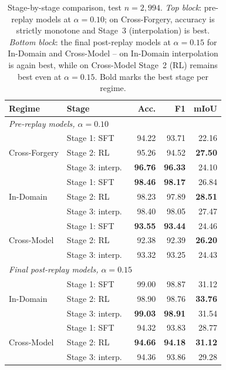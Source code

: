 \documentclass[10pt,twocolumn,letterpaper]{article}
\begin{document}
\begin{table}[h]
\centering
\small
\caption{Stage-by-stage comparison, test $n{=}2{,}994$. \emph{Top block}: pre-replay models at $\alpha{=}0.10$; on Cross-Forgery, accuracy is strictly monotone and Stage~3 (interpolation) is best. \emph{Bottom block}: the final post-replay models at $\alpha{=}0.15$ for In-Domain and Cross-Model -- on In-Domain interpolation is again best, while on Cross-Model Stage~2 (RL) remains best even at $\alpha{=}0.15$. Bold marks the best stage per regime.}
\label{tab:ablation-regime-transfer}
\begin{tabular}{llrrr}
\toprule
Regime & Stage & Acc. & F1 & mIoU \\
\midrule
\multicolumn{5}{l}{\textit{Pre-replay models, $\alpha{=}0.10$}} \\
\midrule
\multirow{3}{*}{Cross-Forgery} & Stage 1: SFT & 94.22 & 93.71 & 22.16 \\
 & Stage 2: RL & 95.26 & 94.52 & \textbf{27.50} \\
 & Stage 3: interp.\ & \textbf{96.76} & \textbf{96.33} & 24.10 \\
\midrule
\multirow{3}{*}{In-Domain} & Stage 1: SFT & \textbf{98.46} & \textbf{98.17} & 26.84 \\
 & Stage 2: RL & 98.23 & 97.89 & \textbf{28.51} \\
 & Stage 3: interp.\ & 98.40 & 98.05 & 27.47 \\
\midrule
\multirow{3}{*}{Cross-Model} & Stage 1: SFT & \textbf{93.55} & \textbf{93.44} & 24.46 \\
 & Stage 2: RL & 92.38 & 92.39 & \textbf{26.20} \\
 & Stage 3: interp.\ & 93.32 & 93.25 & 24.43 \\
\midrule
\multicolumn{5}{l}{\textit{Final post-replay models, $\alpha{=}0.15$}} \\
\midrule
\multirow{3}{*}{In-Domain} & Stage 1: SFT & 99.00 & 98.87 & 31.12 \\
 & Stage 2: RL & 98.90 & 98.76 & \textbf{33.76} \\
 & Stage 3: interp.\ & \textbf{99.03} & \textbf{98.91} & 31.54 \\
\midrule
\multirow{3}{*}{Cross-Model} & Stage 1: SFT & 94.32 & 93.83 & 28.77 \\
 & Stage 2: RL & \textbf{94.66} & \textbf{94.18} & \textbf{31.12} \\
 & Stage 3: interp.\ & 94.36 & 93.86 & 29.28 \\
\bottomrule
\end{tabular}
\end{table}
\end{document}
